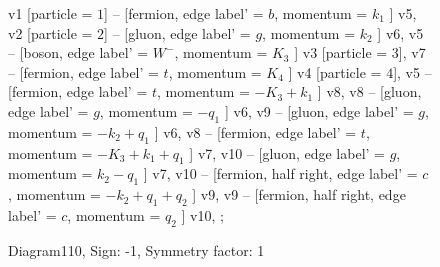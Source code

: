 \documentclass{revtex4}
\begin{document}
\begin{figure}[!htb]
\begin{center}
{    %
v1 [particle = \(1\)] -- [fermion, edge label' = \(b\), momentum = \(k_{1}\) ] v5, 
v2 [particle = \(2\)] -- [gluon, edge label' = \(g\), momentum = \(k_{2}\) ] v6, 
v5 -- [boson, edge label' = \(W^{-}\), momentum = \(K_{3}\) ] v3 [particle = \(3\)], 
v7 -- [fermion, edge label' = \(t\), momentum = \(K_{4}\) ] v4 [particle = \(4\)], 
v5 -- [fermion, edge label' = \(t\), momentum = \(-K_{3} + k_{1}\) ] v8, 
v8 -- [gluon, edge label' = \(g\), momentum = \(-q_{1}\) ] v6, 
v9 -- [gluon, edge label' = \(g\), momentum = \(-k_{2} + q_{1}\) ] v6, 
v8 -- [fermion, edge label' = \(t\), momentum = \(-K_{3} + k_{1} + q_{1}\) ] v7, 
v10 -- [gluon, edge label' = \(g\), momentum = \(k_{2} - q_{1}\) ] v7, 
v10 -- [fermion, half right, edge label' = \(c\), momentum = \(-k_{2} + q_{1} + q_{2}\) ] v9, 
v9 -- [fermion, half right, edge label' = \(c\), momentum = \(q_{2}\) ] v10, 
};
\end{center}
\caption{Diagram110, Sign: -1, Symmetry factor: 1}
\end{figure}
\newpage
\end{document}
